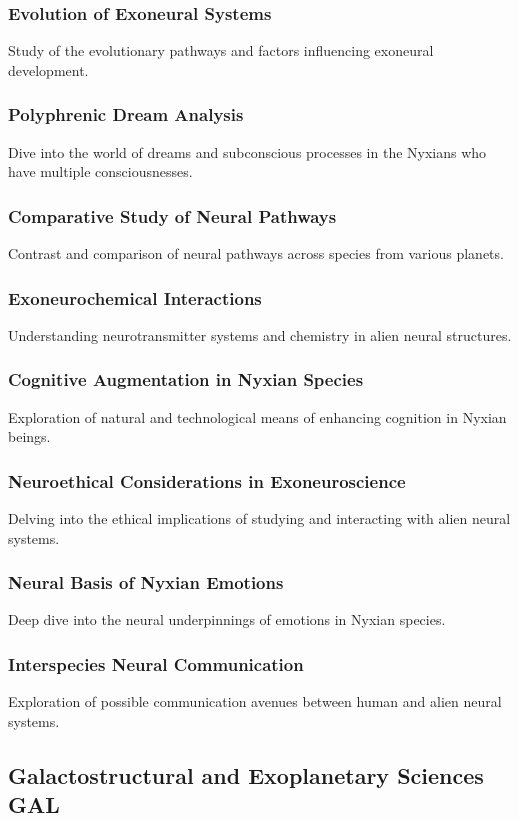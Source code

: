 \subsubsection{Evolution of Exoneural Systems}
Study of the evolutionary pathways and factors influencing exoneural development.
\subsubsection{Polyphrenic Dream Analysis}
Dive into the world of dreams and subconscious processes in the Nyxians who have multiple consciousnesses.
\subsubsection{Comparative Study of Neural Pathways}
Contrast and comparison of neural pathways across species from various planets.
\subsubsection{Exoneurochemical Interactions}
Understanding neurotransmitter systems and chemistry in alien neural structures.
\subsubsection{Cognitive Augmentation in Nyxian Species}
Exploration of natural and technological means of enhancing cognition in Nyxian beings.
\subsubsection{Neuroethical Considerations in Exoneuroscience}
Delving into the ethical implications of studying and interacting with alien neural systems.
\subsubsection{Neural Basis of Nyxian Emotions}
Deep dive into the neural underpinnings of emotions in Nyxian species.
\subsubsection{Interspecies Neural Communication}
Exploration of possible communication avenues between human and alien neural systems.


\subsection{Galactostructural and Exoplanetary Sciences \hfill GAL}
